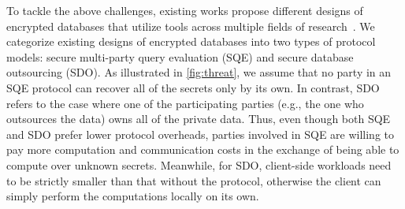 To tackle the above challenges, existing works propose different designs of encrypted
databases that utilize tools across multiple fields of 
research~\cite{sagma,eskandarian2017oblidb,priebe2018enclavedb,esolute,yi2012single,wang2021secure,liagouris2021secrecy,poddar2021senate,waldo,heda}.
We categorize existing designs of encrypted databases
into two types of protocol models: secure multi-party query evaluation (SQE) and 
secure database outsourcing (SDO).
As illustrated in \cref{fig:threat}, we assume that no party 
in an SQE protocol can recover all of the secrets only by its own.
In contrast, SDO refers to the case where one of the participating parties 
(e.g., the one who outsources the data) owns all of the private data. 
Thus, even though both SQE and SDO prefer lower
protocol overheads, parties involved in SQE are willing to pay more
computation and communication costs in the exchange of being
able to compute over unknown secrets. Meanwhile, for SDO, client-side workloads need
to be strictly smaller than that without the protocol, otherwise the client
can simply perform the computations locally on its own.

